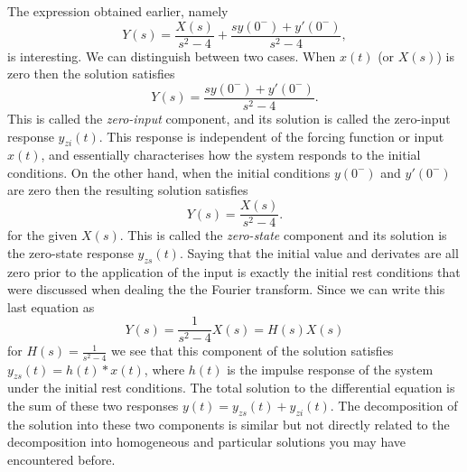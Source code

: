 \documentclass[10pt]{beamer}
\newcommand{\conv}{\ast}
\begin{document}
The expression obtained earlier, namely 
\begin{equation*}
  Y(s) = \frac{X(s)}{s^2-4} + \frac{s y(0^-) + y'(0^-)}{s^2-4},
\end{equation*}
is interesting.  We can distinguish between two cases.  When $x(t)$ (or $X(s)$) is zero then the solution satisfies
\begin{equation*}
  Y(s) = \frac{s y(0^-) + y'(0^-)}{s^2-4}.
\end{equation*}
This is called the {\em zero-input} component, and its solution is called the zero-input response $y_{zi}(t)$.  This response is independent of the forcing function or input $x(t)$, and essentially characterises how the system responds to the initial conditions.  On the other hand, when the initial conditions $y(0^-)$ and $y'(0^-)$ are zero then the resulting solution satisfies
\begin{equation*}
  Y(s) = \frac{X(s)}{s^2-4}.
\end{equation*}
for the given $X(s)$.  This is called the {\em zero-state} component and its solution is the zero-state response $y_{zs}(t)$.  Saying that the initial value and derivates are all zero prior to the application of the input is exactly the initial rest conditions that were discussed when dealing the the Fourier transform.  Since we can write this last equation as
\begin{equation*}
  Y(s) = \frac{1}{s^2-4} X(s) = H(s) X(s)
\end{equation*}
for $H(s)= \frac{1}{s^2-4}$ we see that this component of the solution satisfies $y_{zs}(t) = h(t) \conv x(t)$, where $h(t)$ is the impulse response of the system under the initial rest conditions.  The total solution to the differential equation is the sum of these two responses $y(t) = y_{zs}(t) + y_{zi}(t)$.  The decomposition of the solution into these two components is similar but not directly related to the decomposition into homogeneous and particular solutions you may have encountered before.
\end{document}
